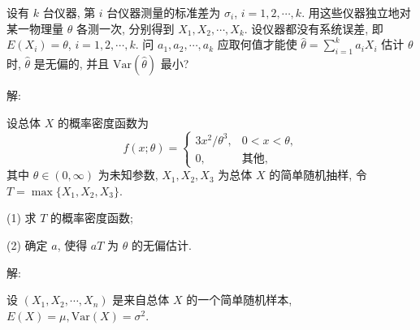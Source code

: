 \documentclass[standard]{ExBook}
\begin{document}
\begin{qitems}
\vspace{-5em}

    \begin{bbox}
    \begin{shaded}
        \qitem
设有 \(k\) 台仪器, 第 \(i\) 台仪器测量的标准差为 \(\sigma_i\), \(i = 1, 2, \cdots, k\). 用这些仪器独立地对某一物理量 \(\theta\) 各测一次, 分别得到 \(X_1, X_2, \cdots, X_k\). 设仪器都没有系统误差, 即 \(E(X_i) = \theta\), \(i = 1, 2, \cdots, k\). 问 \(a_1, a_2, \cdots, a_k\) 应取何值才能使 \(\hat{\theta} = \displaystyle\sum\limits_{i=1}^k a_i X_i\) 估计 \(\theta\) 时, \(\hat{\theta}\) 是无偏的, 并且 \(\text{Var}(\hat{\theta})\) 最小?
    \end{shaded}
    \end{bbox}

\vspace{-5em}

    \begin{bbox}
解: 
    \end{bbox}

\vspace{-5em}

    \begin{bbox}
    \begin{shaded}
        \qitem
设总体 \( X \) 的概率密度函数为
\[f(x;\theta) = 
\begin{cases} 
3x^2/\theta^3, & 0 < x < \theta, \\
0, & \text{其他},
\end{cases}\]
其中 \(\theta \in (0,\infty)\) 为未知参数, \(X_1, X_2, X_3\) 为总体 \(X\) 的简单随机抽样, 令 \(T = \max\{X_1, X_2, X_3\}\).

(1) 求 \(T\) 的概率密度函数;

(2) 确定 \(a\), 使得 \(aT\) 为 \(\theta\) 的无偏估计.
    \end{shaded}
    \end{bbox}

\vspace{-5em}

    \begin{bbox}
解: 
    \end{bbox}

\vspace{-5em}

    \begin{bbox}
    \begin{shaded}
        \qitem
设 \((X_1, X_2, \cdots, X_n)\) 是来自总体 \(X\) 的一个简单随机样本, \(E(X) = \mu, \text{Var}(X) = \sigma^2\).


\end{shaded}
\end{bbox}
\end{qitems}
\end{document}
